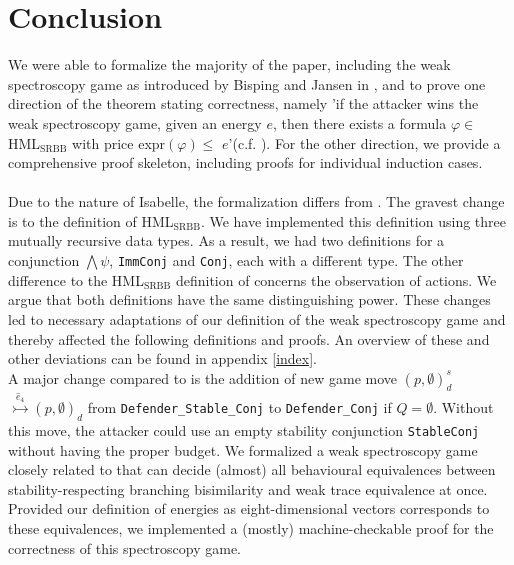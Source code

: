 \newpage
\section{Conclusion}
We were able to formalize the majority of the paper, including the weak spectroscopy game as introduced by Bisping and Jansen in \cite{bj2023silentStepSpectroscopyArxiv}, 
and to prove one direction of the theorem stating correctness, namely 'if the attacker wins the weak spectroscopy game, given an energy $e$, then there exists a formula $\varphi \in$ HML$_\text{SRBB}$ with price expr$(\varphi) \leq$ $e$'(c.f. \cite[lemma $2$, $3$]{bj2023silentStepSpectroscopyArxiv}). 
For the other direction, we provide a comprehensive proof skeleton, including proofs for individual induction cases.
\\\\
Due to the nature of Isabelle, the formalization differs from \cite{bj2024silentStepSpectroscopyExpress}. The gravest change is to the definition of HML$_\text{SRBB}$. 
We have implemented this definition using three mutually recursive data types. As a result, we had two definitions for a conjunction $\bigwedge\psi$, 
\texttt{ImmConj} and \texttt{Conj}, each with a different type. 
The other difference to the HML$_\text{SRBB}$ definition of \cite{bj2024silentStepSpectroscopyExpress} concerns the observation of actions. 
We argue that both definitions have the same distinguishing power. 
These changes led to necessary adaptations of our definition of the weak spectroscopy game and thereby affected the following definitions and proofs.
An overview of these and other deviations can be found in appendix \ref{index}. 
\\
A major change compared to \cite{bj2024silentStepSpectroscopyExpress} is the addition of new game move $(p,\emptyset)_{d}^{s}$ $\overset{\hat{e}_4}{\rightarrowtail} (p,\emptyset)_d$ from \texttt{Defender\_Stable\_Conj} to \texttt{Defender\_Conj} if $Q = \emptyset$. 
Without this move, the attacker could use an empty stability conjunction \texttt{StableConj} without having the proper budget. 
We formalized a weak spectroscopy game closely related to \cite{bj2024silentStepSpectroscopyExpress} that can decide (almost) all behavioural equivalences between stability-respecting branching bisimilarity and weak trace equivalence at once.
Provided our definition of energies as eight-dimensional vectors corresponds to these equivalences, we implemented a (mostly) machine-checkable proof for the correctness of this spectroscopy game.
\\\\
